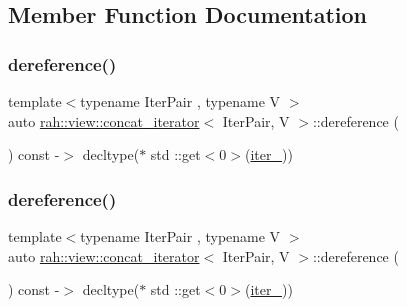 \subsection{Member Function Documentation}
\mbox{\label{structrah_1_1view_1_1concat__iterator_a8449f70baf374fb27f6cf7dbb80e2d17}} 
\subsubsection{\texorpdfstring{dereference()}{dereference()}\hspace{0.1cm}{\footnotesize\ttfamily [1/2]}}
{\footnotesize\ttfamily template$<$typename Iter\+Pair , typename V $>$ \\
auto \mbox{\hyperlink{structrah_1_1view_1_1concat__iterator}{rah\+::view\+::concat\+\_\+iterator}}$<$ Iter\+Pair, V $>$\+::dereference (\begin{DoxyParamCaption}{ }\end{DoxyParamCaption}) const -\/$>$ decltype($\ast$ std \+::get$<$0$>$(\mbox{\hyperlink{structrah_1_1view_1_1concat__iterator_affb17b45b66a04b01962c8b84dc20c43}{iter\+\_\+}}))
	\hspace{0.3cm}{\ttfamily [inline]}}

\mbox{\label{structrah_1_1view_1_1concat__iterator_a8449f70baf374fb27f6cf7dbb80e2d17}} 
\subsubsection{\texorpdfstring{dereference()}{dereference()}\hspace{0.1cm}{\footnotesize\ttfamily [2/2]}}
{\footnotesize\ttfamily template$<$typename Iter\+Pair , typename V $>$ \\
auto \mbox{\hyperlink{structrah_1_1view_1_1concat__iterator}{rah\+::view\+::concat\+\_\+iterator}}$<$ Iter\+Pair, V $>$\+::dereference (\begin{DoxyParamCaption}{ }\end{DoxyParamCaption}) const -\/$>$ decltype($\ast$ std \+::get$<$0$>$(\mbox{\hyperlink{structrah_1_1view_1_1concat__iterator_affb17b45b66a04b01962c8b84dc20c43}{iter\+\_\+}}))
	\hspace{0.3cm}{\ttfamily [inline]}}


